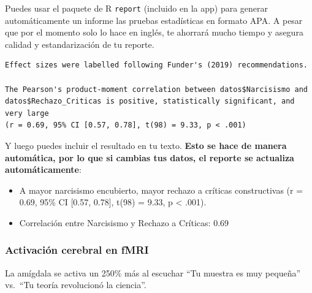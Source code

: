 \documentclass[
  10pt]{article}
\providecommand{\tightlist}{%
  \setlength{\itemsep}{0pt}\setlength{\parskip}{0pt}}\usepackage{longtable,booktabs,array}
\begin{document}
\begin{tcolorbox}[enhanced jigsaw, colframe=quarto-callout-tip-color-frame, opacitybacktitle=0.6, coltitle=black, colback=white, left=2mm, breakable, bottomtitle=1mm, toptitle=1mm, titlerule=0mm, toprule=.15mm, opacityback=0, rightrule=.15mm, bottomrule=.15mm, colbacktitle=quarto-callout-tip-color!10!white, arc=.35mm, leftrule=.75mm, title=\textcolor{quarto-callout-tip-color}{\faLightbulb}\hspace{0.5em}{Tip}]

Puedes usar el paquete de R \texttt{report} (incluido en la app) para
generar automáticamente un informe las pruebas estadísticas en formato
APA. A pesar que por el momento solo lo hace en inglés, te ahorrará
mucho tiempo y asegura calidad y estandarización de tu reporte.

\begin{verbatim}
Effect sizes were labelled following Funder's (2019) recommendations.

The Pearson's product-moment correlation between datos$Narcisismo and
datos$Rechazo_Criticas is positive, statistically significant, and very large
(r = 0.69, 95% CI [0.57, 0.78], t(98) = 9.33, p < .001)
\end{verbatim}

Y luego puedes incluir el resultado en tu texto. \textbf{Esto se hace de
manera automática, por lo que si cambias tus datos, el reporte se
actualiza automáticamente}:

\begin{itemize}
\tightlist
\item
  A mayor narcisismo encubierto, mayor rechazo a críticas constructivas
  (r = 0.69, 95\% CI {[}0.57, 0.78{]}, t(98) = 9.33, p \textless{}
  .001).
\item
  Correlación entre Narcisismo y Rechazo a Críticas: 0.69
\end{itemize}

\end{tcolorbox}

\subsubsection{Activación cerebral en
fMRI}\label{activaciuxf3n-cerebral-en-fmri}

La amígdala se activa un 250\% más al escuchar ``Tu muestra es muy
pequeña'' vs.~``Tu teoría revolucionó la ciencia''.
\end{document}
